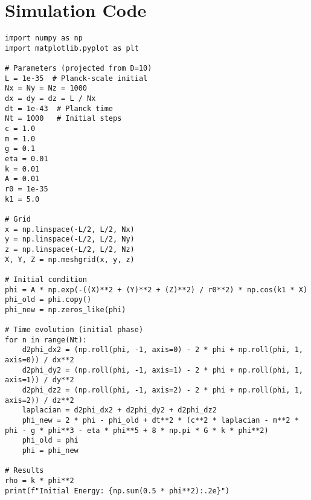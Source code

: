 \documentclass[11pt]{article}
\begin{document}
\appendix
\section{Simulation Code}
\lstset{language=Python, basicstyle=\footnotesize\ttfamily, breaklines=true, numbers=left}
\begin{lstlisting}
import numpy as np
import matplotlib.pyplot as plt

# Parameters (projected from D=10)
L = 1e-35  # Planck-scale initial
Nx = Ny = Nz = 1000
dx = dy = dz = L / Nx
dt = 1e-43  # Planck time
Nt = 1000   # Initial steps
c = 1.0
m = 1.0
g = 0.1
eta = 0.01
k = 0.01
A = 0.01
r0 = 1e-35
k1 = 5.0

# Grid
x = np.linspace(-L/2, L/2, Nx)
y = np.linspace(-L/2, L/2, Ny)
z = np.linspace(-L/2, L/2, Nz)
X, Y, Z = np.meshgrid(x, y, z)

# Initial condition
phi = A * np.exp(-((X)**2 + (Y)**2 + (Z)**2) / r0**2) * np.cos(k1 * X)
phi_old = phi.copy()
phi_new = np.zeros_like(phi)

# Time evolution (initial phase)
for n in range(Nt):
    d2phi_dx2 = (np.roll(phi, -1, axis=0) - 2 * phi + np.roll(phi, 1, axis=0)) / dx**2
    d2phi_dy2 = (np.roll(phi, -1, axis=1) - 2 * phi + np.roll(phi, 1, axis=1)) / dy**2
    d2phi_dz2 = (np.roll(phi, -1, axis=2) - 2 * phi + np.roll(phi, 1, axis=2)) / dz**2
    laplacian = d2phi_dx2 + d2phi_dy2 + d2phi_dz2
    phi_new = 2 * phi - phi_old + dt**2 * (c**2 * laplacian - m**2 * phi - g * phi**3 - eta * phi**5 + 8 * np.pi * G * k * phi**2)
    phi_old = phi
    phi = phi_new

# Results
rho = k * phi**2
print(f"Initial Energy: {np.sum(0.5 * phi**2):.2e}")
\end{lstlisting}



\end{document}
